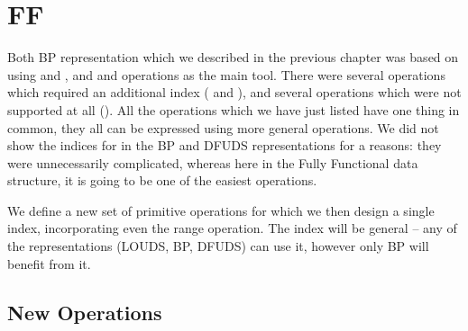\section{FF}

Both BP representation which we described in the previous chapter was based on using \rank{} and \select{}, and \match{} and \enclose{} operations as the main tool.
There were several operations which required an additional index (\childAny{} and \levelAncestor{}), and several operations which were not supported at all (\levelAny{}).
All the operations which we have just listed have one thing in common, they all can be expressed using more general operations.
We did not show the indices for \levelAncestor in the BP and DFUDS representations for a reasons: they were unnecessarily complicated, whereas here in the Fully Functional data structure, it is going to be one of the easiest operations.

We define a new set of primitive operations for which we then design a single index, incorporating even the range operation.
The index will be general -- any of the representations (LOUDS, BP, DFUDS) can use it, however only BP will benefit from it.

\subsection{New Operations}

